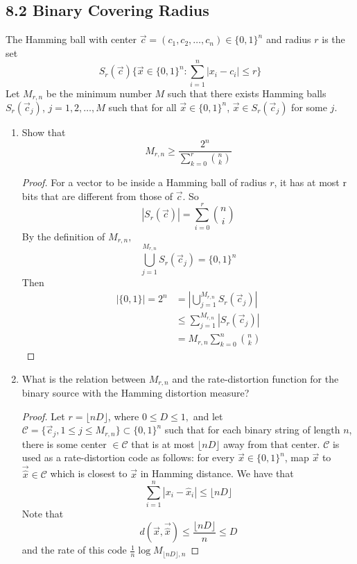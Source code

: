 \documentclass[../main.tex]{subfiles}
\begin{document}
\subsection*{8.2 Binary Covering Radius} The Hamming ball with center $\vec c = (c_1,c_2,\dots,c_n)\in \{0,1\}^n$ and radius $r$ is the set \[
S_r(\vec c) \{\vec x \in \{0,1\}^n: \sum_{i=1}^n |x_i-c_i| \leq r\}
\]
Let $M_{r,n}$ be the minimum number $M$ such that there exists Hamming balls $S_r(\vec c_j)$, $j=1,2,\dots,M$ such that for all $\vec x \in \{0,1\}^n$, $\vec x\in S_r(\vec c_j)$ for some $j.$ \begin{enumerate}
    \item Show that \[
    M_{r,n} \geq \frac{2^n}{\sum_{k=0}^r \binom{n}{k}}
    \]
    \begin{proof}
        For a vector to be inside a Hamming ball of radius $r$, it has at most r bits that are different from those of $\vec c$. So \[
        |S_r(\vec c)|=\sum_{i=0}^r \binom{n}{i}
        \]
        By the definition of $M_{r,n},$ \[
        \bigcup_{j=1}^{M_{r,n}} S_r(\vec c_j) = \{0,1\}^n
        \]
        Then \begin{align*}
            |\{0,1\}|=2^n &= |\bigcup_{j=1}^{M_{r,n}} S_r(\vec c_j)|\\
            &\leq \sum_{j=1}^{M_{r,n}}|S_r(\vec c_j)|\\
            &= M_{r,n} \sum_{k=0}^n\binom{n}{k}
        \end{align*}
    \end{proof}
    \item What is the relation between $M_{r,n}$ and the rate-distortion function for the binary source with the Hamming distortion measure?
    \begin{proof}
    Let $r = \lfloor nD\rfloor$, where $0\leq D\leq 1,$ and let $\mathcal{C}=\{\vec c_j, 1\leq j\leq M_{r,n}\}\subset \{0,1\}^n$ such that for each binary string of length $n$, there is some center $\in \mathcal{C}$ that is at most $\lfloor nD\rfloor$ away from that center. $\mathcal{C}$ is used as a rate-distortion code as follows: for every $\vec x\in \{0,1\}^n$, map $\vec x$ to $\vec{\hat x}\in \mathcal{C}$ which is closest to $\vec x$ in Hamming distance. We have that 
    \[
        \sum_{i=1}^n|x_i-\hat x_i| \leq \lfloor nD\rfloor
    \]
    Note that \[
    d(\vec x, \vec{\hat x}) \leq \frac{\lfloor nD\rfloor}{n} \leq D
    \] and the rate of this code $\frac{1}{n}\log M_{\lfloor nD\rfloor, n}$
    \end{proof}
\end{enumerate}
\end{document}
